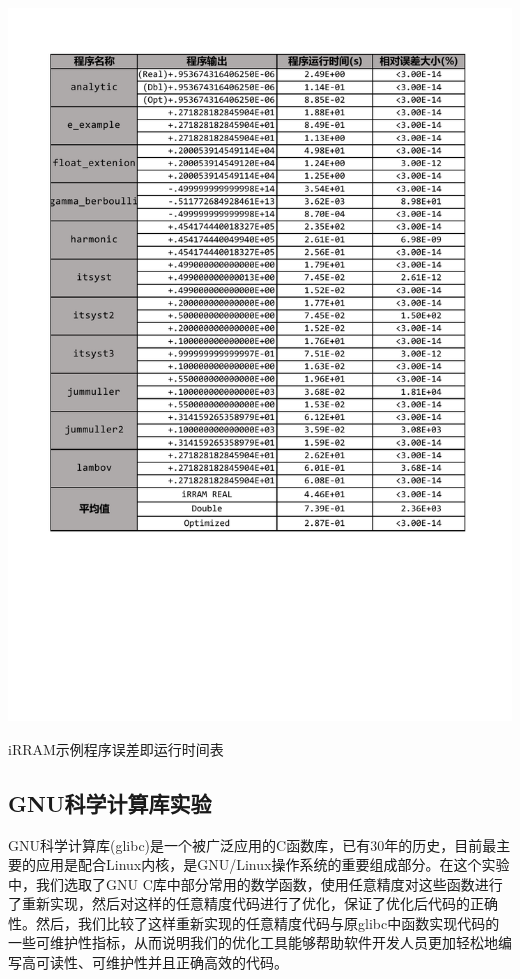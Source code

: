 \begin{table}[thbp]
   \centering
   \includegraphics[width=\columnwidth]{fig/EvalTable_ErrorTime.pdf}
   \caption{iRRAM示例程序误差即运行时间表} \label{fig:error_time}
\end{table}

\subsection{GNU科学计算库实验}

GNU科学计算库(glibc)是一个被广泛应用的C函数库，已有30年的历史，目前最主要的应用是配合Linux内核，是GNU/Linux操作系统的重要组成部分。在这个实验中，我们选取了GNU C库中部分常用的数学函数，使用任意精度对这些函数进行了重新实现，然后对这样的任意精度代码进行了优化，保证了优化后代码的正确性。然后，我们比较了这样重新实现的任意精度代码与原glibc中函数实现代码的一些可维护性指标，从而说明我们的优化工具能够帮助软件开发人员更加轻松地编写高可读性、可维护性并且正确高效的代码。

